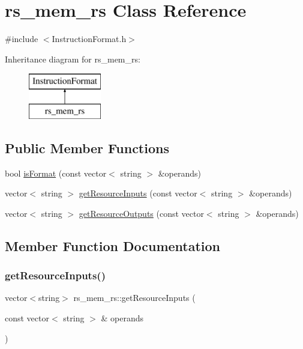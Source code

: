 \hypertarget{classrs__mem__rs}{}\section{rs\+\_\+mem\+\_\+rs Class Reference}
\label{classrs__mem__rs}


{\ttfamily \#include $<$Instruction\+Format.\+h$>$}

Inheritance diagram for rs\+\_\+mem\+\_\+rs\+:\begin{figure}[H]
\begin{center}
\leavevmode
\includegraphics[height=2.000000cm]{classrs__mem__rs}
\end{center}
\end{figure}
\subsection*{Public Member Functions}
\begin{DoxyCompactItemize}
\item 
bool \hyperlink{classrs__mem__rs_abf2731ea9f051772088147dcecb111dc}{is\+Format} (const vector$<$ string $>$ \&operands)
\item 
vector$<$ string $>$ \hyperlink{classrs__mem__rs_acf80e20421747fcaa4b0ae7af2db591a}{get\+Resource\+Inputs} (const vector$<$ string $>$ \&operands)
\item 
vector$<$ string $>$ \hyperlink{classrs__mem__rs_ad93e4a2a21f172863e3daf317db69ad1}{get\+Resource\+Outputs} (const vector$<$ string $>$ \&operands)
\end{DoxyCompactItemize}


\subsection{Member Function Documentation}
\mbox{\label{classrs__mem__rs_acf80e20421747fcaa4b0ae7af2db591a}} 
\subsubsection{\texorpdfstring{get\+Resource\+Inputs()}{getResourceInputs()}}
{\footnotesize\ttfamily vector$<$string$>$ rs\+\_\+mem\+\_\+rs\+::get\+Resource\+Inputs (\begin{DoxyParamCaption}\item[{const vector$<$ string $>$ \&}]{operands }\end{DoxyParamCaption})\hspace{0.3cm}{\ttfamily [virtual]}}


